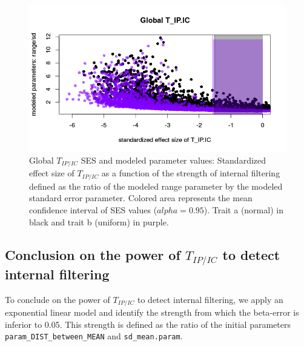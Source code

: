 \documentclass[12pt]{article}\usepackage[]{graphicx}\usepackage[]{color}
\makeatletter
\def\maxwidth{ %
  \ifdim\Gin@nat@width>\linewidth
    \linewidth
  \else
    \Gin@nat@width
  \fi
}
\newenvironment{knitrout}{}{} %
\makeatother
\begin{document}
\begin{knitrout}
\begin{figure}
{\centering \includegraphics[width=\maxwidth]{figure/Internal_filter_Results_plots_modeled_param-1} 

}

\caption[Global $T_{IP/IC}$ SES and modeled parameter values]{Global $T_{IP/IC}$ SES and modeled parameter values: Standardized effect size of $T_{IP/IC}$ as a function of the strength of internal filtering defined as the ratio of the modeled range parameter by the modeled standard error parameter. Colored area represents the mean confidence interval of SES values ($alpha = 0.95$). Trait a (normal) in black and trait b (uniform) in purple.}\label{fig:Internal_filter_Results_plots_modeled_param}
\end{figure}


\end{knitrout}

  \subsection {Conclusion on the power of $T_{IP/IC}$ to detect internal filtering}

To conclude on the power of $T_{IP/IC}$ to detect internal filtering, we apply an exponential linear model and identify the strength from which the beta-error is inferior to 0.05. This strength is defined as the ratio of the initial parameters \texttt{param\_DIST\_between\_MEAN} and \texttt{sd\_mean.param}. 
\end{document}

